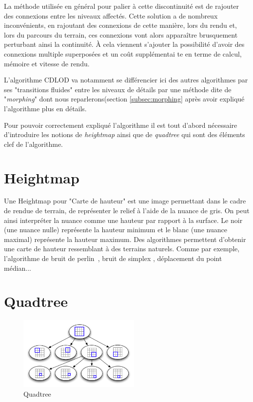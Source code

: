  
 La méthode utilisée en général pour palier à cette discontinuité est de rajouter des connexions entre les niveaux affectés. 
 Cette solution a de nombreux inconvénients, en rajoutant des connexions de cette manière, lors du rendu et, lors du parcours du terrain, ces connexions vont alors apparaître brusquement perturbant ainsi la continuité. À cela viennent s'ajouter la possibilité d'avoir des connexions multiple superposées et un coût supplémentai te en terme de calcul, mémoire et vitesse de rendu.
 
 L'algorithme CDLOD va notamment se différencier ici des autres algorithmes par ses "transitions fluides" entre les niveaux de détails par une méthode dite de "\textit{morphing}" dont nous reparlerons(section \ref{subsec:morphing} après avoir expliqué l'algorithme plus en détails.
 
 Pour pouvoir correctement expliqué l'algorithme il est tout d'abord nécessaire d'introduire les notions de  \textit{heightmap} ainsi que de \textit{quadtree} qui sont des éléments clef de l'algorithme.
 
  \section{Heightmap}
  \label{sec:heightmap}
  
  Une Heightmap pour "Carte de hauteur" est une image permettant dans le cadre de rendue de terrain, de représenter le relief à l'aide de la nuance de gris. On peut ainsi interpréter la nuance comme une hauteur par rapport à la surface. Le noir (une nuance nulle) représente la hauteur minimum et le blanc (une nuance maximal) représente la hauteur maximum. Des algorithmes permettent d'obtenir une carte de hauteur ressemblant à des terrains naturels. Comme par exemple, l'algorithme de bruit de perlin~\cite{Perlin}, bruit de simplex , déplacement du point médian...
  
  
  
  \section{Quadtree}
  \label{sec:quadtree}
  
\begin{figure}
 \includegraphics[width=6cm]{img/quadtree-arbre.png}
   \caption[Quadtree]{Quadtree\protect\footnotemark}
   \label{fig:quadtree-arbre}
 \end{figure}
  
